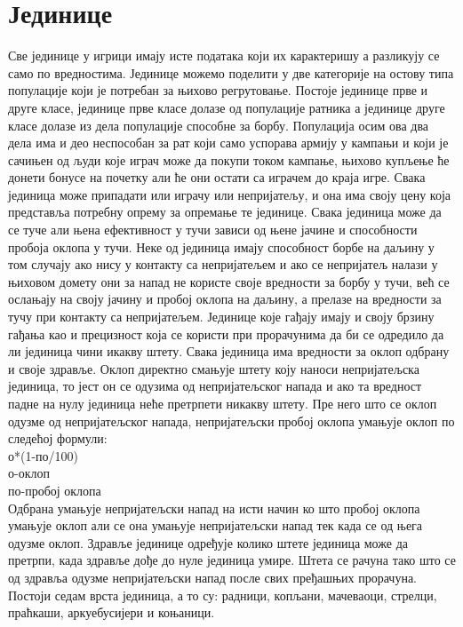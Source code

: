 \documentclass[11pt,a4paper]{article}
\begin{document}
\section{Јединице}
Све јединице у игрици имају исте података који их карактеришу а разликују се само по вредностима. Јединице можемо поделити у две категорије на остову типа популације који је потребан за њихово регрутовање. Постоје јединице прве и друге класе, јединице прве класе долазе од популације ратника а јединице друге класе долазе из дела популације способне за борбу. Популација осим ова два дела има и део неспособан за рат који само успорава армију у кампањи и који је сачињен од људи које играч може да покупи током кампање, њихово купљење ће донети бонусе на почетку али ће они остати са играчем до краја игре. Свака јединица може припадати или играчу или непријатељу, и она има своју цену која представља потребну опрему за опремање те јединице. Свака јединица може да се туче али њена ефективност у тучи зависи од њене јачине и способности пробоја оклопа у тучи. Неке од јединица имају способност борбе на даљину у том случају ако нису у контакту са непријатељем и ако се непријатељ налази у њиховом домету они за напад не користе своје вредности за борбу у тучи, већ се ослањају на своју јачину и пробој оклопа на даљину, а прелазе на вредности за тучу при контакту са непријатељем. Јединице које гађају имају и своју брзину гађања као и прецизност која се користи при прорачунима да би се одредило да ли јединица чини икакву штету. Свака јединица има вредности за оклоп одбрану и своје здравље. Оклоп директно смањује штету коју наноси непријатељска јединица, то јест он се одузима од непријатељског напада и ако та вредност падне на нулу јединица неће претрпети никакву штету. Пре него што се оклоп одузме од непријатељског напада, непријатељски пробој оклопа умањује оклоп по следећој формули:
\\ о*(1-по/100)
\\ о-оклоп 
\\ по-пробој оклопа
\\ Одбрана умањује непријатељски напад на исти начин ко што пробој оклопа умањује оклоп али се она умањује непријатељски напад тек када се од њега одузме оклоп. Здравље јединице одређује колико штете јединица може да претрпи, када здравље дође до нуле јединица умире. Штета се рачуна тако што се од здравља одузме непријатељски напад после свих пређашњих прорачуна. Постоји седам врста јединица, а то су: радници, копљани, мачеваоци, стрелци, праћкаши, аркуебусијери и коњаници.
\end{document}
